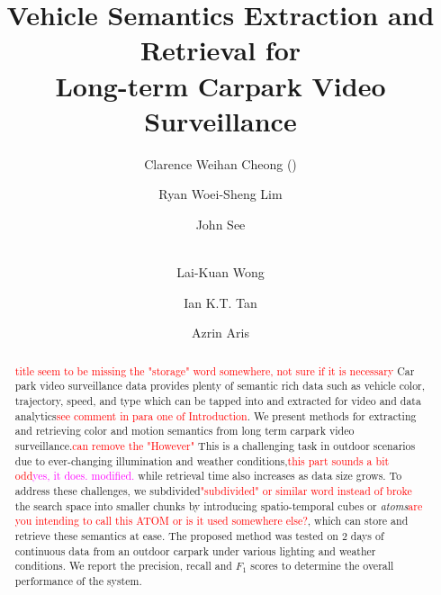 \documentclass[runningheads]{llncs}
\newcommand{\ian}[1]{\textcolor{red}{#1}}
\newcommand{\js}[1]{\textcolor{magenta}{#1}}
\newcommand{\ian}[1]{}   %
\newcommand{\js}[1]{}   %
\begin{document}
\title{Vehicle Semantics Extraction and Retrieval for \\Long-term Carpark Video Surveillance}
%
%
\author{Clarence Weihan Cheong (\Letter)  \and Ryan Woei-Sheng Lim \and
John See \and \\ Lai-Kuan Wong \and Ian K.T. Tan \and Azrin Aris}
%
%
%

\maketitle              %

\begin{abstract}
\ian{title seem to be missing the "storage" word somewhere, not sure if it is necessary} Car park video surveillance data provides plenty of semantic rich data such as vehicle color, trajectory, speed, and type which can be tapped into and extracted for video and data analytics\ian{see comment in para one of Introduction}. We present methods for extracting and retrieving color and motion semantics from long term carpark video surveillance.\ian{can remove the "However"} This is a challenging task in outdoor scenarios due to ever-changing illumination and weather conditions,\ian{this part sounds a bit odd}\js{yes, it does. modified.} while retrieval time also increases as data size grows.
To address these challenges, we subdivided\ian{"subdivided" or similar word instead of broke} the search space into smaller chunks by introducing spatio-temporal cubes or \emph{atoms}\ian{are you intending to call this ATOM or is it used somewhere else?}, which can store and retrieve these semantics at ease. The proposed method was tested on 2 days of continuous data from an outdoor carpark under various lighting and weather conditions. We report the precision, recall and $F_1$ scores to determine the overall performance of the system. %

\end{abstract}
%
\end{document}

